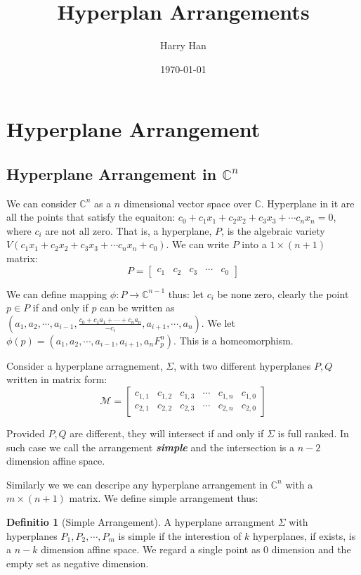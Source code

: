 \documentclass[12pt, a4paper]{article}
\title{Hyperplan Arrangements}
\author{Harry Han}
\date{\today}
\theoremstyle{definition}
\newtheorem{definition}{Definitio}[section]
\theoremstyle{remark}
\newcommand{\bb}[1]{\mathbb{#1}}
\renewcommand{\emph}[1]{\textit{\textbf{#1}}}
\begin{document}
\maketitle
\section{Hyperplane Arrangement}

\subsection{Hyperplane Arrangement in $\bb{C}^n$}

We can consider $\bb{C}^n$ as a $n$ dimensional vector space over $\bb{C}$. 
Hyperplane in it are all the points that satisfy the equaiton: $c_0 + c_1x_1 + c_2x_2 + c_3x_3 + \cdots c_nx_n = 0$, where $c_i$ are not all zero.
That is, a hyperplane, $P$, is the algebraic variety $V(c_1x_1 + c_2x_2 + c_3x_3 + \cdots c_nx_n + c_0)$. 
We can write $P$ into a $1\times (n+1)$ matrix: 
$$
P = 
\begin{bmatrix}
	c_1 & c_2 & c_3 & \cdots & c_0
\end{bmatrix}
$$

We can define mapping $\phi: P \rightarrow  \bb{C}^{n-1}$ thus:
let $c_i$ be none zero, clearly the point $p \in P$ if and only if $p$ can be written as 
\\
$(a_1, a_2, \cdots, a_{i-1}, \frac{c_0 + c_1a_1 + \cdots + c_na_n}{-c_i}, a_{i+1}, \cdots, a_n)$.
We let  
\\
$\phi(p) = (a_1, a_2, \cdots, a_{i-1}, a_{i+1}, a_nF_p^n)$.
This is a homeomorphism.

Consider a hyperplane arragnement, $\Sigma$, with two different hyperplanes $P, Q$ written in matrix form:
$$
\mathcal{M} = 
\begin{bmatrix}
	c_{1,1} & c_{1,2} & c_{1,3} & \cdots & c_{1,n} & c_{1,0} \\
	c_{2,1} & c_{2,2} & c_{2,3} & \cdots & c_{2,n} & c_{2,0}
\end{bmatrix}
$$

Provided $P, Q$ are different, they will intersect if and only if $\Sigma$ is full ranked. In such case we call the arrangement \emph{simple} and the intersection is a $n-2$ dimension affine space.

Similarly we we can descripe any hyperplane arrangement in $\bb{C}^{n}$ with a $m \times ( n + 1)$ matrix. We define simple arrangement thus: 

\begin{definition}[Simple Arrangement]
A hyperplane arrangment $\Sigma$ with hyperplanes $P_1, P_2, \cdots, P_m$ is simple if the interestion of $k$ hyperplanes, if exists, is a $n-k$ dimension affine space. 
We regard a single point as 0 dimension and the empty set as negative dimension.
\end{definition}
\end{document}
